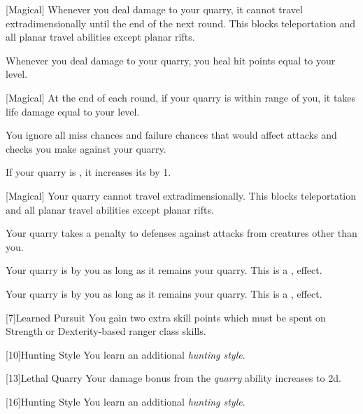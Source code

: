             [Magical]
            Whenever you deal damage to your quarry, it cannot travel extradimensionally until the end of the next round.
            This blocks teleportation and all planar travel abilities except planar rifts.

            Whenever you deal damage to your quarry, you heal hit points equal to your level.

            [Magical]
            At the end of each round, if your quarry is within \rnglong range of you, it takes life damage equal to your level.

            You ignore all miss chances and failure chances that would affect attacks and checks you make against your quarry.

            If your quarry is , it increases its  by 1.

            [Magical]
            Your quarry cannot travel extradimensionally.
            This blocks teleportation and all planar travel abilities except planar rifts.

            Your quarry takes a  penalty to defenses against attacks from creatures other than you.

            Your quarry is \taunted by you as long as it remains your quarry.
            This is a ,  effect.

            Your quarry is \frightened by you as long as it remains your quarry.
            This is a ,  effect.

            [7]{Learned Pursuit} You gain two extra skill points which must be spent on Strength or Dexterity-based ranger class skills.

            [10]{Hunting Style}
            You learn an additional \textit{hunting style}.

            [13]{Lethal Quarry}
            Your damage bonus from the \textit{quarry} ability increases to \plus2d.

            [16]{Hunting Style}
            You learn an additional \textit{hunting style}.

